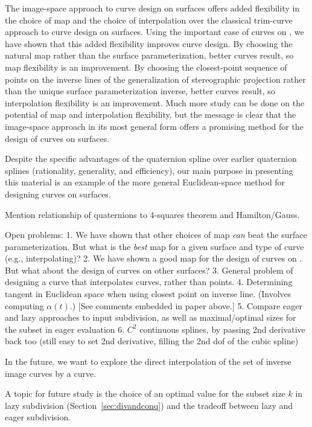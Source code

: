 The image-space approach to curve design on surfaces offers
added flexibility in the choice of map and the choice of interpolation
over the classical trim-curve approach to curve design on surfaces.
Using the important case of curves on , 
we have shown that this added flexibility improves curve design.
By choosing the natural map rather than the surface parameterization,
better curves result, so map flexibility is an improvement.
By choosing the closest-point sequence of points on the inverse lines
of the generalization of stereographic projection
rather than the unique surface parameterization inverse,
better curves result, so interpolation flexibility is an improvement.
Much more study can be done on the potential of map and interpolation
flexibility, but the message is clear that the 
image-space approach in its most general form offers a promising
method for the design of curves on surfaces.

Despite the specific advantages of the quaternion spline
over earlier quaternion splines (rationality, generality, and efficiency), 
our main purpose in presenting this material
is an example of the more general Euclidean-space method for designing
curves on surfaces.


Mention relationship of quaternions to 4-squares theorem and Hamilton/Gauss.

Open problems: 
	1. We have shown that other choices of map {\em can} beat the surface
	parameterization.
	But what is the {\em best} map for a given surface and type of curve (e.g., interpolating)?
	2. We have shown a good map for the design of curves on .
	But what about the design of curves on other surfaces?
	3. General problem of designing a curve that interpolates curves, rather than points.
	4. Determining tangent in Euclidean space when using closest point on inverse line.
		(Involves computing $\alpha(t)$.)
		[See comments embedded in paper above.]
	5. Compare eager and lazy approaches to input subdivision,
	   as well as maximal/optimal sizes for the subset in eager evaluation
	6. $C^2$ continuous splines, by passing 2nd derivative back too
		(still easy to set 2nd derivative, filling the 2nd dof of the cubic spline)

In the future, we want to explore the direct interpolation of the set
of inverse image curves by a curve.

A topic for future study is the choice of an optimal value
for the subset size $k$ in lazy subdivision (Section~\ref{sec:divandconq})
and the tradeoff between lazy and eager subdivision.


